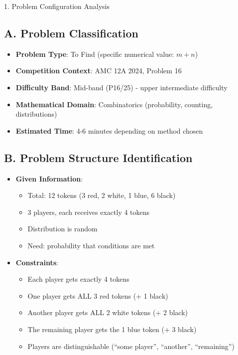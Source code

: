\documentclass[12pt]{article}
\begin{document}
\begin{configbox}{1. Problem Configuration Analysis}

\subsection*{A. Problem Classification}
\begin{itemize}[leftmargin=*]
    \item \textbf{Problem Type}: To Find (specific numerical value: $m+n$)
    \item \textbf{Competition Context}: AMC 12A 2024, Problem 16
    \item \textbf{Difficulty Band}: Mid-band (P16/25) - upper intermediate difficulty
    \item \textbf{Mathematical Domain}: Combinatorics (probability, counting, distributions)
    \item \textbf{Estimated Time}: 4-6 minutes depending on method chosen
\end{itemize}

\subsection*{B. Problem Structure Identification}
\begin{itemize}[leftmargin=*]
    \item \textbf{Given Information}: 
    \begin{itemize}
        \item Total: 12 tokens (3 red, 2 white, 1 blue, 6 black)
        \item 3 players, each receives exactly 4 tokens
        \item Distribution is random
        \item Need: probability that conditions are met
    \end{itemize}
    
    \item \textbf{Constraints}: 
    \begin{itemize}
        \item Each player gets exactly 4 tokens
        \item One player gets ALL 3 red tokens (+ 1 black)
        \item Another player gets ALL 2 white tokens (+ 2 black)
        \item The remaining player gets the 1 blue token (+ 3 black)
        \item Players are distinguishable (``some player'', ``another'', ``remaining'')
    \end{itemize}
    

\end{itemize}
\end{configbox}
\end{document}
